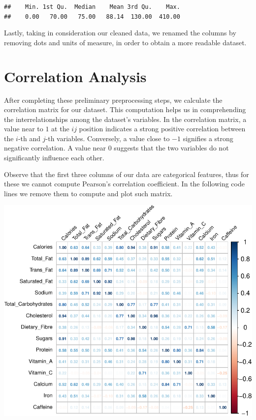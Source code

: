 \documentclass[
]{article}
\begin{document}
\begin{verbatim}
##    Min. 1st Qu.  Median    Mean 3rd Qu.    Max. 
##    0.00   70.00   75.00   88.14  130.00  410.00
\end{verbatim}

Lastly, taking in consideration our cleaned data, we renamed the columns
by removing dots and units of measure, in order to obtain a more
readable dataset.

\section{Correlation Analysis}\label{correlation-analysis}

After completing these preliminary preprocessing steps, we calculate the
correlation matrix for our dataset. This computation helps us in
comprehending the interrelationships among the dataset's variables. In
the correlation matrix, a value near to \(1\) at the \(ij\) position
indicates a strong positive correlation between the \(i\)-th and
\(j\)-th variables. Conversely, a value close to \(-1\) signifies a
strong negative correlation. A value near \(0\) suggests that the two
variables do not significantly influence each other.

Observe that the first three columns of our data are categorical
features, thus for these we cannot compute Pearson's correlation
coefficient. In the following code lines we remove them to compute and
plot such matrix.

\begin{center}\includegraphics{Statistical_Learning_Final_Report_files/figure-latex/correlation_analysis-1} \end{center}
\end{document}
